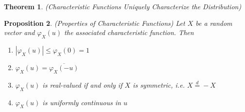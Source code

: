 \documentclass[12pt]{article}
\theoremstyle{plain}
\newtheorem{thm}{Theorem}[section]
\newtheorem{prop}[thm]{Proposition}
\theoremstyle{definition}
\theoremstyle{remark}
\begin{document}
\begin{thm}
\label{thm:charfcnunq}
\emph{(Characteristic Functions Uniquely Characterize the Distribution)}
\end{thm}

\begin{prop}\emph{(Properties of Characteristic Functions)}
Let $X$ be a random vector and $\varphi_X(u)$ the associated
characteristic function. Then
\begin{enumerate}[label=\emph{(\roman*)}]
  \item $|\varphi_X(u)| \leq \varphi_X(0) = 1$
  \item $\varphi_X(u) = \overline{\varphi_X(-u)}$
  \item $\varphi_X(u)$ is real-valued if and only if $X$ is symmetric,
    i.e. $X \overset{d}{=} -X$
  \item $\varphi_X(u)$ is uniformly continuous in $u$
\end{enumerate}
\end{prop}
\end{document}

